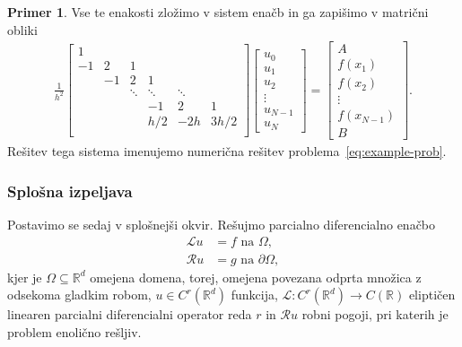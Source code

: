 \documentclass[12pt,a4paper,twoside]{article}
\theoremstyle{definition} %
\newtheorem{primer}[definicija]{Primer}
\theoremstyle{plain} %
\numberwithin{equation}{section}
\newcommand{\R}{\mathbb R}
\newcommand{\Rc}{\mathcal{R}}
\renewcommand{\L}{\mathcal{L}}
\begin{document}
\begin{primer}
Vse te enakosti zložimo v sistem enačb in ga zapišimo v matrični obliki
\begin{align}
  \frac{1}{h^2}
  \begin{bmatrix}
    1 &  \\
    -1 & 2 & 1 \\
    & -1 & 2 & 1 \\
    & & \!\ddots & \!\ddots & \! \ddots \\
    &&& -1 & 2 & 1 \\
    &&& h/2 & -2h & 3h/2 \\
  \end{bmatrix}
\begin{bmatrix}
  u_0 \\ u_1 \\ u_2 \\ \vdots \\ u_{N-1} \\ u_N
\end{bmatrix}
 =
 \begin{bmatrix}
   A \\
   f(x_1) \\
   f(x_2) \\
   \vdots \\
   f(x_{N-1}) \\
   B
 \end{bmatrix}.
\end{align}
Rešitev tega sistema imenujemo numerična rešitev problema~\eqref{eq:example-prob}.
\end{primer}

\subsubsection{Splošna izpeljava}
\label{sec:splosna-izpeljava}
Postavimo se sedaj v splošnejši okvir.
Rešujmo parcialno diferencialno enačbo
\begin{align}
  \L u &= f \text{ na } \Omega, \label{eq:general-problem} \\
  \Rc u &= g \text{ na } \partial \Omega \nonumber,
\end{align}
kjer je $\Omega \subseteq \R^d$ omejena domena, torej, omejena povezana odprta
množica z odsekoma gladkim robom, $u \in C^r(\R^d)$ funkcija,
$\L\colon C^r(\R^d) \to C(\R)$ eliptičen linearen
parcialni diferencialni operator reda $r$ in $\Rc u$ robni pogoji,
pri katerih je problem enolično rešljiv.
\end{document}
